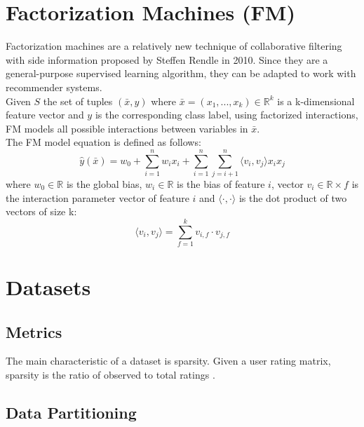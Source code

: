\section{Factorization Machines (FM)}
\label{sc:factorization-machines}

Factorization machines \cite{10.1109/ICDM.2010.127} are a relatively new technique of collaborative filtering with side information proposed by Steffen Rendle in 2010. Since they are a general-purpose supervised learning algorithm, they can be adapted to work with recommender systems.\\
Given $S$ the set of tuples $(\bar{x}, y)$ where $\bar{x} = (x_1, ..., x_k) \in \mathbb{R}^k$ is a k-dimensional feature vector and $y$ is the corresponding class label, using factorized interactions, FM models all possible interactions between variables in $\bar{x}$.\\
The FM model equation is defined as follows:
\begin{equation*}
\hat{y}(\bar{x}) = w_0 + \sum_{i = 1}^{n} w_i x_i + \sum_{i = 1}^{n} \sum_{j = i + 1}^{n} \langle v_i, v_j \rangle x_i x_j
\end{equation*}
where $w_0 \in \mathbb{R}$ is the global bias, $w_i \in \mathbb{R}$ is the bias of feature $i$, vector $v_i \in \mathbb{R} \times f$ is the interaction parameter vector of feature $i$ and $\langle \cdot, \cdot \rangle$ is the dot product of two vectors of size k:
\begin{equation*}
\langle v_i, v_j \rangle = \sum_{f = 1}^{k} v_{i,f} \cdot v_{j,f}
\end{equation*}



\section{Datasets}


\subsection{Metrics}

The main characteristic of a dataset is sparsity. Given a user rating matrix, sparsity is the ratio of observed to total ratings \cite{sparsity}.


\subsection{Data Partitioning}

